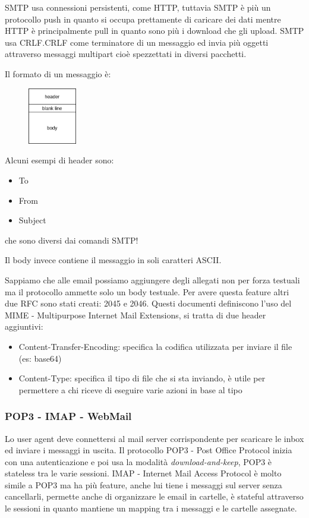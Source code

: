 SMTP usa connessioni persistenti, come HTTP, tuttavia SMTP è più un protocollo push in quanto si occupa prettamente di caricare dei dati mentre HTTP è principalmente pull in quanto sono più i download che gli upload.
SMTP usa CRLF.CRLF come terminatore di un messaggio ed invia più oggetti attraverso messaggi multipart cioè spezzettati in diversi pacchetti.

Il formato di un messaggio è:
\begin{figure}[H]
    \centering
    \includegraphics[width=80px]{images/2_Applicazioni_di_rete/messaggio_smtp.png}
\end{figure}
Alcuni esempi di header sono:
\begin{itemize}
    \item To
    \item From
    \item Subject
\end{itemize}
che sono diversi dai comandi SMTP!

Il body invece contiene il messaggio in soli caratteri ASCII.

Sappiamo che alle email possiamo aggiungere degli allegati non per forza testuali ma il protocollo ammette solo un body testuale.
Per avere questa feature altri due RFC sono stati creati: 2045 e 2046.
Questi documenti definiscono l'uso del MIME - Multipurpose Internet Mail Extensions, si tratta di due header aggiuntivi:
\begin{itemize}
    \item Content-Transfer-Encoding: specifica la codifica utilizzata per inviare il file (es: base64)
    \item Content-Type: specifica il tipo di file che si sta inviando, è utile per permettere a chi riceve di eseguire varie azioni in base al tipo
\end{itemize}

\subsubsection{POP3 - IMAP - WebMail}
Lo user agent deve connettersi al mail server corrispondente per scaricare le inbox ed inviare i messaggi in uscita.
Il protocollo POP3 - Post Office Protocol inizia con una autenticazione e poi usa la modalità \emph{download-and-keep}, POP3 è stateless tra le varie sessioni.
IMAP - Internet Mail Access Protocol è molto simile a POP3 ma ha più feature, anche lui tiene i messaggi sul server senza cancellarli, permette anche di organizzare le email in cartelle, è stateful attraverso le sessioni in quanto mantiene un mapping tra i messaggi e le cartelle assegnate.

